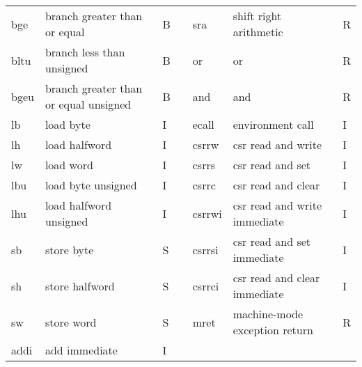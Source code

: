 \documentclass[../specifications.tex]{subfiles}
\begin{document}
\begin{table}[h]
\begin{tabular}{|l|l|l|llll}
    bge   & branch greater than or equal          & B  & \multicolumn{1}{l|}{} & \multicolumn{1}{l|}{sra}    & \multicolumn{1}{l|}{shift right arithmetic}        & \multicolumn{1}{l|}{R}  \\
    bltu  & branch less than unsigned             & B  & \multicolumn{1}{l|}{} & \multicolumn{1}{l|}{or}     & \multicolumn{1}{l|}{or}                            & \multicolumn{1}{l|}{R}  \\
    bgeu  & branch greater than or equal unsigned & B  & \multicolumn{1}{l|}{} & \multicolumn{1}{l|}{and}    & \multicolumn{1}{l|}{and}                           & \multicolumn{1}{l|}{R}  \\
    lb    & load byte                             & I  & \multicolumn{1}{l|}{} & \multicolumn{1}{l|}{ecall}  & \multicolumn{1}{l|}{environment call}              & \multicolumn{1}{l|}{I}  \\
    lh    & load halfword                         & I  & \multicolumn{1}{l|}{} & \multicolumn{1}{l|}{csrrw}  & \multicolumn{1}{l|}{csr read and write}            & \multicolumn{1}{l|}{I}  \\
    lw    & load word                             & I  & \multicolumn{1}{l|}{} & \multicolumn{1}{l|}{csrrs}  & \multicolumn{1}{l|}{csr read and set}              & \multicolumn{1}{l|}{I}  \\
    lbu   & load byte unsigned                    & I  & \multicolumn{1}{l|}{} & \multicolumn{1}{l|}{csrrc}  & \multicolumn{1}{l|}{csr read and clear}            & \multicolumn{1}{l|}{I}  \\
    lhu   & load halfword unsigned                & I  & \multicolumn{1}{l|}{} & \multicolumn{1}{l|}{csrrwi} & \multicolumn{1}{l|}{csr read and write immediate}  & \multicolumn{1}{l|}{I}  \\
    sb    & store byte                            & S  & \multicolumn{1}{l|}{} & \multicolumn{1}{l|}{csrrsi} & \multicolumn{1}{l|}{csr read and set immediate}    & \multicolumn{1}{l|}{I}  \\
    sh    & store halfword                        & S  & \multicolumn{1}{l|}{} & \multicolumn{1}{l|}{csrrci} & \multicolumn{1}{l|}{csr read and clear immediate}  & \multicolumn{1}{l|}{I}  \\
    sw    & store word                            & S  & \multicolumn{1}{l|}{} & \multicolumn{1}{l|}{mret}   & \multicolumn{1}{l|}{machine-mode exception return} & \multicolumn{1}{l|}{R}  \\ \cline{5-7}
    addi  & add immediate                         & I  &                       &                             &                                                    &                         \\

\end{tabular}
\end{table}
\end{document}
